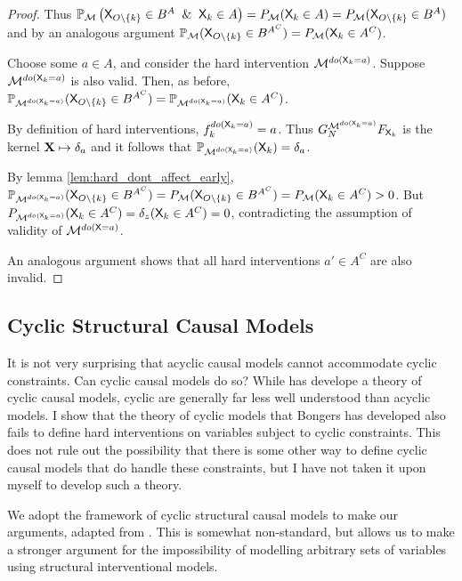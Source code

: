 \begin{proof}
Thus $\mathbb{P}_{\mathcal{M}}\left(\RV{X}_{O\setminus\{k\}}\in B^A \And \RV{X}_k\in A\right)=P_{\mathcal{M}} (\RV{X}_k\in A)=P_{\mathcal{M}}(\RV{X}_{O\setminus\{k\}}\in B^A)$ and by an analogous argument $\mathbb{P}_{\mathcal{M}}(\mathsf{X}_{O\setminus\{k\}}\in B^{A^C})=P_{\mathcal{M}} (\mathsf{X}_k\in A^C)$.

Choose some $a\in A$, and consider the hard intervention $\mathcal{M}^{do(\mathsf{X}_k=a)}$. Suppose $\mathcal{M}^{do(\mathsf{X}_k=a)}$ is also valid. Then, as before, $\mathbb{P}_{\mathcal{M}^{do(\mathsf{X}_k=a)}}(\mathsf{X}_{O\setminus\{k\}}\in B^{A^C})=\mathbb{P}_{\mathcal{M}^{do(\mathsf{X}_k=a)}}(\mathsf{X}_k\in A^C)$.

By definition of hard interventions, $f_k^{do(\mathsf{X}_k=a)} = a$. Thus $G^{\mathcal{M}^{do(\mathsf{X}_k=a)}}_N F_{\mathsf{X}_k}$ is the kernel $\mathbf{X}\mapsto \delta_a$ and it follows that $\mathbb{P}_{\mathcal{M}^{do(\mathsf{X}_k=a)}}(\mathsf{X}_k) = \delta_a$. 

By lemma \ref{lem:hard_dont_affect_early}, $\mathbb{P}_{\mathcal{M}^{do(\mathsf{X}_k=a)}}(\mathsf{X}_{O\setminus\{k\}}\in B^{A^C})=P_{\mathcal{M}}(\mathsf{X}_{O\setminus\{k\}}\in B^{A^C}) = P_{\mathcal{M}}(\mathsf{X}_k\in A^C)>0$. But $P_{\mathcal{M}^{do(\mathsf{X}_k=a)}}(\mathsf{X}_k \in {A^C})=\delta_z(\mathsf{X}_k\in A^C)=0$, contradicting the assumption of validity of $\mathcal{M}^{do(\mathsf{X}=a)}$.

An analogous argument shows that all hard interventions $a'\in A^C$ are also invalid.
\end{proof}

\subsection{Cyclic Structural Causal Models}

It is not very surprising that acyclic causal models cannot accommodate cyclic constraints. Can cyclic causal models do so? While \citet{bongers_theoretical_2016} has develope a theory of cyclic causal models, cyclic are generally far less well understood than acyclic models. I show that the theory of cyclic models that Bongers has developed also fails to define hard interventions on variables subject to cyclic constraints. This does not rule out the possibility that there is some other way to define cyclic causal models that do handle these constraints, but I have not taken it upon myself to develop such a theory.


We adopt the framework of cyclic structural causal models to make our arguments, adapted from \citet{bongers_theoretical_2016}. This is somewhat non-standard, but allows us to make a stronger argument for the impossibility of modelling arbitrary sets of variables using structural interventional models.

